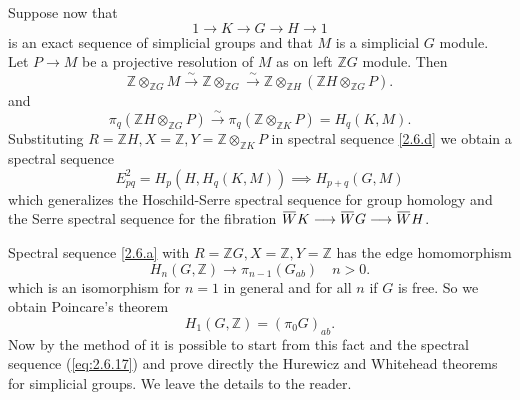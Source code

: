 \documentclass[../main]{subfiles}
\begin{document}
Suppose now that \[1 \longrightarrow  K \longrightarrow  G \longrightarrow  H \longrightarrow  1\]
is an exact sequence of simplicial groups and that $M$ is a simplicial $G$ module. Let $P \longrightarrow  M$ be a projective resolution of $M$ as on left $\mathbb{Z}G$ module. Then 
\[ 
\mathbb{Z} \otimes_{\mathbb{Z} G} M \overset{\sim}{\to}\mathbb{Z} \otimes_{\mathbb{Z}G} \overset{\sim}{\to}\mathbb{Z} \otimes_{\mathbb{Z}H} (\mathbb{Z}H \otimes_{\mathbb{Z}G}P)
.\]
and 
\[ 
\pi_q (\mathbb{Z}H \otimes_{\mathbb{Z}G}P) \overset{\sim}{\to}\pi_q (\mathbb{Z} \otimes_{\mathbb{Z}K}P) = H_q (K, M)
.\]
Substituting $R = \mathbb{Z}H, X = \mathbb{Z}, Y = \mathbb{Z} \otimes_{\mathbb{Z}K} P$ in spectral sequence \ref{2.6.d} we obtain a spectral sequence 
\begin{equation}\label{eq:2.6.17}\tag{17}
E_{pq}^2 = H_p (H, H_q(K, M)) \implies H_{p+q} (G, M)
\end{equation}
which generalizes the Hoschild-Serre spectral sequence for group homology and the Serre spectral sequence for the fibration $\xoverline{W}K \longrightarrow  \xoverline{W}G \longrightarrow  \xoverline{W} H$.

Spectral sequence \ref{2.6.a} with $R = \mathbb{Z}G, X = \mathbb{Z}, Y = \mathbb{Z}$ has the edge homomorphism
\[ 
H_n (G, \mathbb{Z}) \longrightarrow  \pi_{n-1} (G_{ab}) \quad n > 0
.\]
which is an isomorphism for $n = 1$ in general and for all $n$ if $G$ is free. So we obtain Poincare's theorem 
\[ 
H_1 (G, \mathbb{Z}) = (\pi_0 G)_{ab}
.\]
Now by the method of \cite{serre_groupes_1953} it is possible to start from this fact and the spectral sequence (\ref{eq:2.6.17}) and prove directly the Hurewicz and Whitehead theorems for simplicial groups. We leave the details to the reader.
\end{document}
